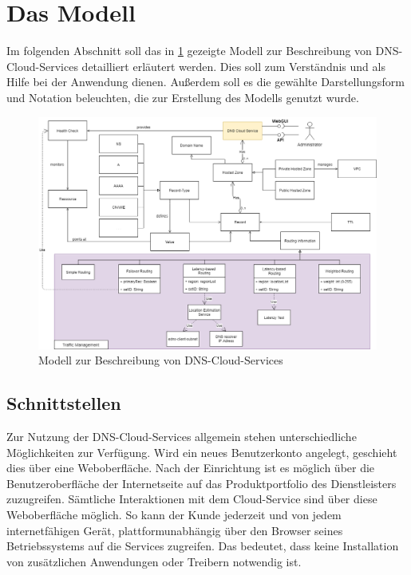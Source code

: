 \section{Das Modell}
Im folgenden Abschnitt soll das in \ref{fig:ccmodel} gezeigte Modell zur Beschreibung von DNS-Cloud-Services detailliert erläutert werden. Dies soll zum Verständnis und als Hilfe bei der Anwendung dienen. Außerdem soll es die gewählte Darstellungsform und Notation beleuchten, die zur Erstellung des Modells genutzt wurde.

\begin{figure}
    \includegraphics[width=\textwidth]{images/cc_modelxml.png}
    \caption{Modell zur Beschreibung von DNS-Cloud-Services}
    \label{fig:ccmodel}
\end{figure}

\subsection{Schnittstellen}
Zur Nutzung der DNS-Cloud-Services allgemein stehen unterschiedliche Möglichkeiten zur Verfügung. Wird ein neues Benutzerkonto angelegt, geschieht dies über eine Weboberfläche. Nach der Einrichtung ist es möglich über die Benutzeroberfläche der Internetseite auf das Produktportfolio des Dienstleisters zuzugreifen. Sämtliche Interaktionen mit dem Cloud-Service sind über diese Weboberfläche möglich. So kann der Kunde jederzeit und von jedem internetfähigen Gerät, plattformunabhängig über den Browser seines Betriebssystems auf die Services zugreifen. Das bedeutet, dass keine Installation von zusätzlichen Anwendungen oder Treibern notwendig ist.

